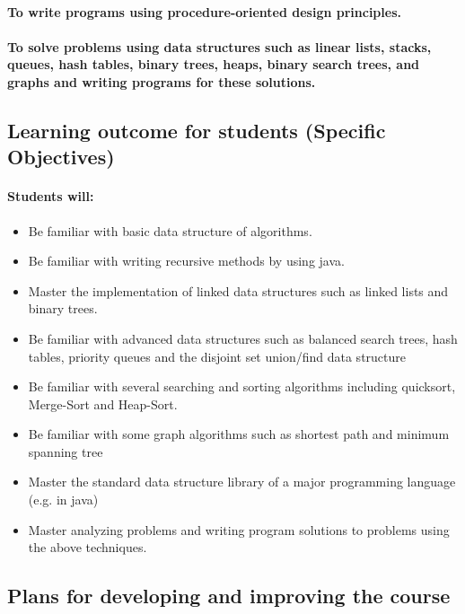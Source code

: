 \documentclass{article}
\begin{document}
\paragraph{To write programs using procedure-oriented design principles.}
\paragraph{To solve problems using data structures such as linear lists, stacks, queues, hash tables, binary trees, heaps, binary search trees, and graphs and writing programs for these solutions\cite{aho1974design}.}
\subsection{Learning outcome for students (Specific Objectives)}
\paragraph{Students will:}

\begin{itemize}
    \item Be familiar with basic data structure of algorithms.  

    \item Be familiar with writing recursive methods by using java.

    \item Master the implementation of linked data structures such as linked lists and binary trees.  

    \item Be familiar with advanced data structures such as balanced search trees, hash tables, priority queues and the disjoint set union/find data structure  
    \item Be familiar with several searching and sorting algorithms including quicksort, Merge-Sort and Heap-Sort\cite{cook1980best}.  

    \item Be familiar with some graph algorithms such as shortest path and minimum spanning tree 
    \item Master the standard data structure library of a major programming language (e.g. in java) 
    \item Master analyzing problems and writing program solutions to problems using the  above techniques.

\end{itemize}

\subsection{Plans for developing and improving the course}
\end{document}
